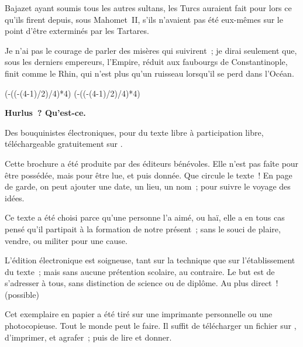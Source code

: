 \documentclass[french,twoside]{book} %
\newcommand\chapterclose{} %
\def\truncdiv#1#2{((#1-(#2-1)/2)/#2)}
\def\moduloop#1#2{(#1-\truncdiv{#1}{#2}*#2)}
\def\modulo#1#2{\number\numexpr\moduloop{#1}{#2}\relax}
\begin{document}
Bajazet ayant soumis tous les autres sultans, les Turcs auraient fait pour lors ce qu’ils firent depuis, sous Mahomet II, s’ils n’avaient pas été eux-mêmes sur le point d’être exterminés par les Tartares.\par
Je n’ai pas le courage de parler des misères qui suivirent ; je dirai seulement que, sous les derniers empereurs, l’Empire, réduit aux faubourgs de Constantinople, finit comme le Rhin, qui n’est plus qu’un ruisseau lorsqu’il se perd dans l’Océan.
\chapterclose

 


\ifbooklet
  \pagestyle{empty}
  \clearpage
  \ifnum\modulo{\value{page}}{4}=0 \hbox{}\newpage\hbox{}\newpage\fi
  \ifnum\modulo{\value{page}}{4}=1 \hbox{}\newpage\hbox{}\newpage\fi


  \hbox{}\newpage
  \ifodd\value{page}\hbox{}\newpage\fi
  {\centering\color{rubric}\bfseries\noindent\large
    Hurlus ? Qu’est-ce.\par
    \bigskip
  }
  \noindent Des bouquinistes électroniques, pour du texte libre à participation libre,
  téléchargeable gratuitement sur \href{https://hurlus.fr}{}.\par
  \bigskip
  \noindent Cette brochure a été produite par des éditeurs bénévoles.
  Elle n’est pas faîte pour être possédée, mais pour être lue, et puis donnée.
  Que circule le texte !
  En page de garde, on peut ajouter une date, un lieu, un nom ; pour suivre le voyage des idées.
  \par

  Ce texte a été choisi parce qu’une personne l’a aimé,
  ou haï, elle a en tous cas pensé qu’il partipait à la formation de notre présent ;
  sans le souci de plaire, vendre, ou militer pour une cause.
  \par

  L’édition électronique est soigneuse, tant sur la technique
  que sur l’établissement du texte ; mais sans aucune prétention scolaire, au contraire.
  Le but est de s’adresser à tous, sans distinction de science ou de diplôme.
  Au plus direct ! (possible)
  \par

  Cet exemplaire en papier a été tiré sur une imprimante personnelle
   ou une photocopieuse. Tout le monde peut le faire.
  Il suffit de
  télécharger un fichier sur \href{https://hurlus.fr}{},
  d’imprimer, et agrafer ; puis de lire et donner.\par
\end{document}
